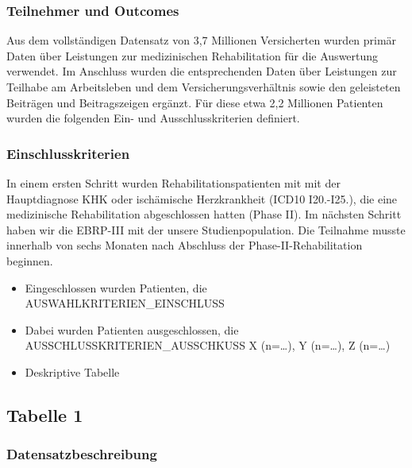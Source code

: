 \documentclass[
]{article}
\providecommand{\tightlist}{%
  \setlength{\itemsep}{0pt}\setlength{\parskip}{0pt}}
\begin{document}
\hypertarget{teilnehmer-und-outcomes}{%
\subsubsection{Teilnehmer und Outcomes}\label{teilnehmer-und-outcomes}}

Aus dem vollständigen Datensatz von 3,7 Millionen Versicherten wurden
primär Daten über Leistungen zur medizinischen Rehabilitation für die
Auswertung verwendet. Im Anschluss wurden die entsprechenden Daten über
Leistungen zur Teilhabe am Arbeitsleben und dem Versicherungsverhältnis
sowie den geleisteten Beiträgen und Beitragszeigen ergänzt. Für diese
etwa 2,2 Millionen Patienten wurden die folgenden Ein- und
Ausschlusskriterien definiert.

\hypertarget{einschlusskriterien}{%
\subsubsection{Einschlusskriterien}\label{einschlusskriterien}}

In einem ersten Schritt wurden Rehabilitationspatienten mit mit der
Hauptdiagnose KHK oder ischämische Herzkrankheit (ICD10 I20.-I25.), die
eine medizinische Rehabilitation abgeschlossen hatten (Phase II). Im
nächsten Schritt haben wir die EBRP-III mit der unsere
Studienpopulation. Die Teilnahme musste innerhalb von sechs Monaten nach
Abschluss der Phase-II-Rehabilitation beginnen.

\begin{itemize}
\tightlist
\item
  Eingeschlossen wurden Patienten, die AUSWAHLKRITERIEN\_EINSCHLUSS
\item
  Dabei wurden Patienten ausgeschlossen, die
  AUSSCHLUSSKRITERIEN\_AUSSCHKUSS X (n=\ldots), Y (n=\ldots), Z
  (n=\ldots)
\item
  Deskriptive Tabelle
\end{itemize}

\hypertarget{tabelle-1}{%
\subsection{Tabelle 1}\label{tabelle-1}}

\hypertarget{datensatzbeschreibung}{%
\subsubsection{Datensatzbeschreibung}\label{datensatzbeschreibung}}
\end{document}
